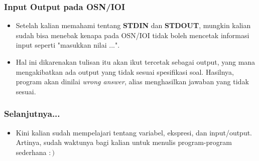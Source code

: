 \documentclass{beamer}
\begin{document}
\begin{frame}
\frametitle{Input Output pada OSN/IOI}
\begin{itemize}
	\item Setelah kalian memahami tentang \textbf{STDIN} dan \textbf{STDOUT}, mungkin kalian sudah bisa menebak kenapa pada OSN/IOI tidak boleh mencetak informasi input seperti "masukkan nilai ...".
	\item Hal ini dikarenakan tulisan itu akan ikut tercetak sebagai output, yang mana mengakibatkan ada output yang tidak sesuai spesifikasi soal. Hasilnya, program akan dinilai \alert{\textit{wrong answer}}, alias menghasilkan jawaban yang tidak sesuai. 
\end{itemize}
\end{frame}

\begin{frame}
\frametitle{Selanjutnya...}
\begin{itemize}
	\item Kini kalian sudah mempelajari tentang variabel, ekspresi, dan input/output. Artinya, sudah waktunya bagi kalian untuk menulis program-program sederhana $:)$
\end{itemize}
\end{frame}
\end{document}
